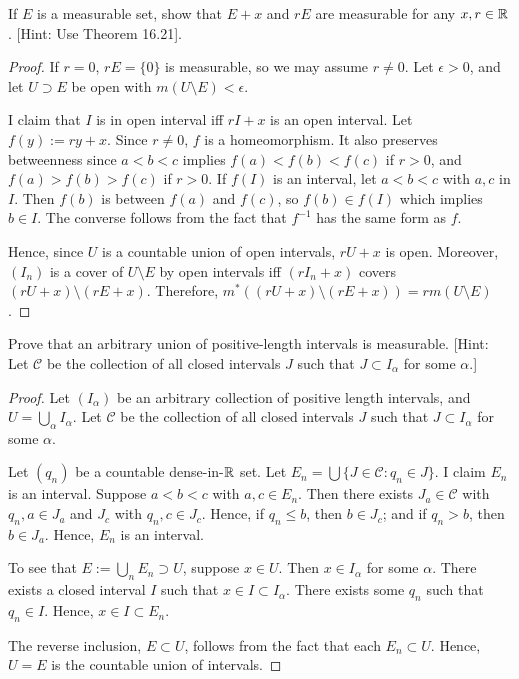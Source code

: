 \documentclass{article}
\begin{document}
 If $E$ is a measurable set, show that $E+x$ and $rE$ are measurable for any $x, r \in \mathbb{R}$. [Hint: Use Theorem 16.21].
\begin{proof}
If $r = 0$, $rE = \{0\}$ is measurable, so we may assume $r \ne 0$.
Let $\epsilon > 0$, and let $U \supset E$ be open with $m(U \setminus E) < \epsilon$. 

I claim that $I$ is in open interval iff $rI +x$ is an open interval. Let $f(y) := ry + x$. Since $r \ne 0$, $f$ is a homeomorphism. It also preserves betweenness since $a < b < c$ implies $f(a) < f(b) < f(c)$ if $r > 0$, and $f(a) > f(b) > f(c)$ if $r > 0$. If $f(I)$ is an interval, let $a<b<c$ with $a,c$ in $I$. Then $f(b)$ is between $f(a)$ and $f(c)$, so $f(b) \in f(I)$ which implies $b \in I$. The converse follows from the fact that $f^{-1}$ has the same form as $f$.

 Hence, since $U$ is a countable union of open intervals, $rU +x$ is open. Moreover, $(I_n)$ is a cover of $U \setminus E$ by open intervals iff $(rI_n + x)$ covers $(rU + x) \setminus (rE +x)$. Therefore, $m^*((rU+x) \setminus (rE+x)) = r m(U \setminus E)$.
\end{proof}
 Prove that an arbitrary union of positive-length intervals is measurable. [Hint: Let $\mathcal{C}$ be the collection of all closed intervals $J$ such that $J \subset I_\alpha$ for some $\alpha$.]
\begin{proof} Let $(I_\alpha)$ be an arbitrary collection of positive length intervals, and $U = \bigcup_\alpha I_\alpha$. Let $\mathcal{C}$ be the collection of all closed intervals $J$ such that $J \subset I_\alpha$ for some $\alpha$.

Let $(q_n)$ be a countable dense-in-$\mathbb{R}$ set. Let $E_n = \bigcup \{J \in \mathcal{C} : q_n \in J\}$. I claim $E_n$ is an interval. Suppose $a<b<c$ with $a,c \in E_n$. Then there exists $J_a \in \mathcal C$ with $q_n, a \in J_a$ and $J_c$ with $q_n, c \in J_c$. Hence, if $q_n \le b$, then $b \in J_c$; and if $q_n > b$, then $b \in J_a$. Hence, $E_n$ is an interval.

To see that $E := \bigcup_n E_n \supset U$, suppose $x \in U$. Then $x \in I_\alpha$ for some $\alpha$. There exists a closed interval $I$ such that $x \in I \subset I_\alpha$. There exists some $q_n$ such that $q_n \in I$. Hence, $x \in I \subset E_n$. 

The reverse inclusion, $E \subset U$, follows from the fact that each $E_n \subset U$. Hence, $U = E$ is the countable union of intervals.

\end{proof}
\end{document}

